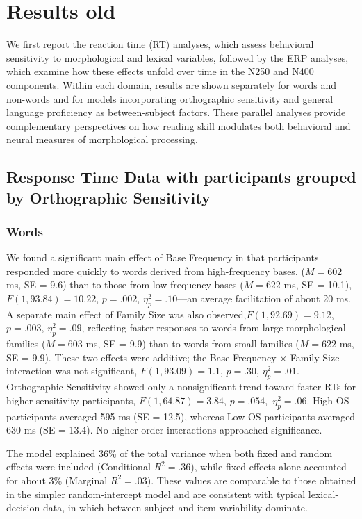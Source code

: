 \documentclass[preprint,12pt, authoryear, review]{elsarticle}
\begin{document}
\section{Results old}

We first report the reaction time (RT) analyses, which assess behavioral sensitivity to morphological and lexical variables, followed by the ERP analyses, which examine how these effects unfold over time in the N250 and N400 components. Within each domain, results are shown separately for words and non-words and for models incorporating orthographic sensitivity and general language proficiency as between-subject factors. These parallel analyses provide complementary perspectives on how reading skill modulates both behavioral and neural measures of morphological processing.

\subsection{Response Time Data with participants grouped by Orthographic Sensitivity}
		
	\subsubsection{Words} 
		
		We found a significant main effect of Base Frequency in that participants responded more quickly to words derived from high-frequency bases, ($M = 602$ ms, SE = 9.6) than to those from low-frequency bases ($M = 622$ ms, SE = 10.1), $F(1, 93.84) = 10.22$, $p = .002$, $\eta_p^2 = .10$—an average facilitation of about 20 ms. A separate main effect of Family Size was also observed,$ F(1, 92.69) = 9.12$, $p = .003$, $\eta_p^2 = .09$, reflecting faster responses to words from large morphological families ($M = 603$ ms, SE = 9.9) than to words from small families ($M = 622$ ms, SE = 9.9). These two effects were additive; the Base Frequency × Family Size interaction was not significant, $F(1, 93.09) = 1.1$, $p = .30$, $\eta_p^2 = .01$. Orthographic Sensitivity showed only a nonsignificant trend toward faster RTs for higher-sensitivity participants, $F(1, 64.87) = 3.84$, $p = .054,$ $\eta_p^2 = .06$. High-OS participants averaged 595 ms (SE = 12.5), whereas Low-OS participants averaged 630 ms (SE = 13.4). No higher-order interactions approached significance. 
			
		The model explained 36\% of the total variance when both fixed and random effects were included (Conditional $R^2 = .36$), while fixed effects alone accounted for about 3\% (Marginal $R^2 = .03$). These values are comparable to those obtained in the simpler random‐intercept model and are consistent with typical lexical‐decision data, in which between‐subject and item variability dominate.
		
\end{document}
